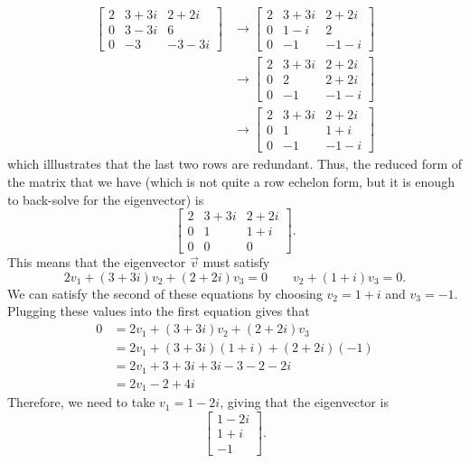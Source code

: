 \documentclass{ximera}
\begin{document}
\begin{exampleSol}
    \[ 
        \begin{split}
            \begin{bmatrix} 
                2 & 3+3i & 2+2i \\ 
                0 & 3-3i & 6 \\ 
                0 & -3 & -3-3i 
            \end{bmatrix} 
            &\rightarrow 
            \begin{bmatrix} 
                2 & 3+3i & 2+2i \\ 
                0 & 1-i & 2 \\ 
                0 & -1 & -1-i 
            \end{bmatrix} \\
            &\rightarrow 
            \begin{bmatrix} 
                2 & 3+3i & 2+2i \\ 
                0 & 2 & 2+2i \\ 
                0 & -1 & -1-i 
            \end{bmatrix} \\
            &\rightarrow 
            \begin{bmatrix} 
                2 & 3+3i & 2+2i \\ 
                0 & 1 & 1+i \\ 
                0 & -1 & -1-i 
            \end{bmatrix}
        \end{split}
    \] 
    which illlustrates that the last two rows are redundant. Thus, the reduced form of the matrix that we have (which is not quite a row echelon form, but it is enough to back-solve for the eigenvector) is
    \[ 
        \begin{bmatrix} 
            2 & 3+3i & 2+2i \\ 
            0 & 1 & 1+i \\ 
            0 & 0 & 0 
        \end{bmatrix}.
    \]
    This means that the eigenvector $\vec{v}$ must satisfy
    \[ 
        2v_1 + (3+3i)v_2 + (2+2i)v_3 = 0 \qquad v_2 + (1+i)v_3 = 0. 
    \]
    We can satisfy the second of these equations by choosing $v_2 = 1+i$ and $v_3 = -1$. Plugging these values into the first equation gives that
    \[ 
        \begin{split}
            0 &= 2v_1 + (3+3i)v_2 + (2+2i)v_3 \\
            &= 2v_1 + (3+3i)(1+i) + (2+2i)(-1) \\
            &= 2v_1 + 3 + 3i + 3i - 3 - 2 - 2i \\
            &= 2v_1 - 2 + 4i
        \end{split} 
    \]
    Therefore, we need to take $v_1 = 1 - 2i$, giving that the eigenvector is
    \[ 
        \begin{bmatrix} 
            1 - 2i \\ 
            1+i \\ 
            -1 
        \end{bmatrix}. 
    \]
    

\end{exampleSol}
\end{document}
